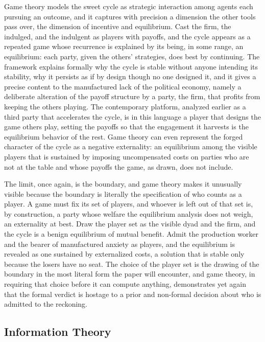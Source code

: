 \documentclass[11pt,a4paper]{article}
\begin{document}
Game theory models the sweet cycle as strategic interaction among agents each pursuing an outcome, and it captures with precision a dimension the other tools pass over, the dimension of incentive and equilibrium. Cast the firm, the indulged, and the indulgent as players with payoffs, and the cycle appears as a repeated game whose recurrence is explained by its being, in some range, an equilibrium: each party, given the others' strategies, does best by continuing. The framework explains formally why the cycle is stable without anyone intending its stability, why it persists as if by design though no one designed it, and it gives a precise content to the manufactured lack of the political economy, namely a deliberate alteration of the payoff structure by a party, the firm, that profits from keeping the others playing. The contemporary platform, analyzed earlier as a third party that accelerates the cycle, is in this language a player that designs the game others play, setting the payoffs so that the engagement it harvests is the equilibrium behavior of the rest. Game theory can even represent the forged character of the cycle as a negative externality: an equilibrium among the visible players that is sustained by imposing uncompensated costs on parties who are not at the table and whose payoffs the game, as drawn, does not include.

The limit, once again, is the boundary, and game theory makes it unusually visible because the boundary is literally the specification of who counts as a player. A game must fix its set of players, and whoever is left out of that set is, by construction, a party whose welfare the equilibrium analysis does not weigh, an externality at best. Draw the player set as the visible dyad and the firm, and the cycle is a benign equilibrium of mutual benefit. Admit the production worker and the bearer of manufactured anxiety as players, and the equilibrium is revealed as one sustained by externalized costs, a solution that is stable only because the losers have no seat. The choice of the player set is the drawing of the boundary in the most literal form the paper will encounter, and game theory, in requiring that choice before it can compute anything, demonstrates yet again that the formal verdict is hostage to a prior and non-formal decision about who is admitted to the reckoning.

\subsection{Information Theory}
\end{document}
